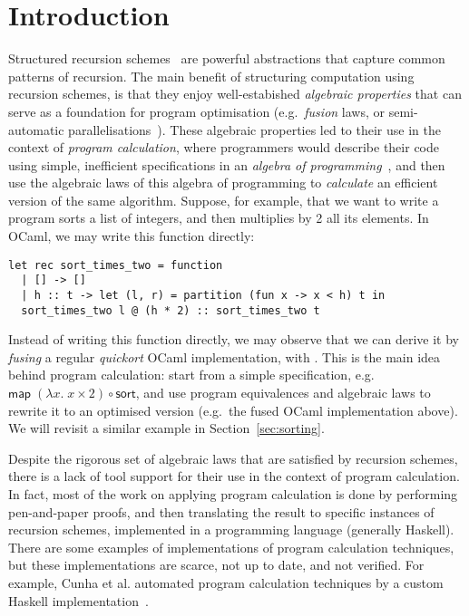 \documentclass{llncs}
\begin{document}
\section{Introduction}
\label{sec:intro}
Structured recursion schemes~\cite{HinzeW16,HinzeWG15} are powerful
abstractions that capture common patterns of recursion. The main benefit of
structuring computation using recursion schemes, is that they enjoy
well-estabished \emph{algebraic properties} that can serve as a foundation for
program optimisation (e.g.\ \emph{fusion} laws, or semi-automatic
parallelisations~\cite{TakanoM95,Gibbons96:Third,Morihata09:Third,farmsCastro}).
These algebraic properties led to their use in the context of
\emph{program calculation}, where programmers would describe their code using
simple, inefficient specifications in an \emph{algebra of
programming}~\cite{BirddeMoor96:Algebra}, and then use the algebraic laws of
this algebra of programming to \emph{calculate} an efficient version of the same
algorithm. Suppose, for example, that we want to write a program sorts a list of
integers, and then multiplies by 2 all its elements. In OCaml, we may write this
function directly:
\begin{verbatim}
let rec sort_times_two = function
  | [] -> []
  | h :: t -> let (l, r) = partition (fun x -> x < h) t in
  sort_times_two l @ (h * 2) :: sort_times_two t
\end{verbatim}
Instead of writing this function directly, we may observe that we can derive it
by \emph{fusing} a regular \emph{quickort} OCaml implementation, with
. This is the main idea behind program calculation:
start
from a simple specification, e.g.\
$\mathsf{map}\;(\lambda x.\;x \times 2) \circ \mathsf{sort}$, and use program
equivalences and algebraic laws to rewrite it to an optimised version  (e.g.\
the fused OCaml implementation above). We will revisit a similar example
in Section~\ref{sec:sorting}.

Despite the rigorous set of algebraic laws that are satisfied by recursion
schemes, there is a lack of tool support for their use in the context of program
calculation. In fact, most of the work on applying program calculation is done
by performing pen-and-paper proofs, and then translating the result to specific
instances of recursion schemes, implemented in a programming language (generally
Haskell). There are some examples of implementations of program calculation
techniques, but these implementations are scarce, not up to date, and not
verified. For example, Cunha et al. automated program calculation techniques by
a custom Haskell implementation~\cite{DrHylo}.
\end{document}
